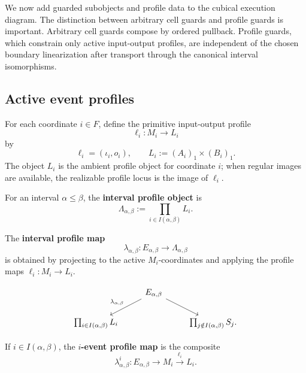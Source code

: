 We now add guarded subobjects and profile data to the cubical execution
diagram. The distinction between arbitrary cell guards and profile guards is
important. Arbitrary cell guards compose by ordered pullback. Profile guards,
which constrain only active input-output profiles, are independent of the
chosen boundary linearization after transport through the canonical interval
isomorphisms.

\subsection{Active event profiles}
\label{subsec:cmett-active-event-profiles}

For each coordinate \(i\in F\), define the primitive input-output profile
\[
    \ell_i:M_i\to L_i
\]
by
\[
    \ell_i=(\iota_i,o_i),
    \qquad
    L_i:=(A_i)_1\times(B_i)_1.
\]
The object \(L_i\) is the ambient profile object for coordinate \(i\); when
regular images are available, the realizable profile locus is the image of
\(\ell_i\).

\begin{definition}
\label{def:cmett-interval-profile-object}
    For an interval \(\alpha\leq\beta\), the \textbf{interval profile object}
    is
    \[
        \Lambda_{\alpha,\beta}
        :=
        \prod_{i\in I(\alpha,\beta)}L_i.
    \]
\end{definition}

\begin{definition}
\label{def:cmett-interval-profile-map}
    The \textbf{interval profile map}
    \[
        \lambda_{\alpha,\beta}:E_{\alpha,\beta}\to\Lambda_{\alpha,\beta}
    \]
    is obtained by projecting to the active \(M_i\)-coordinates and applying
    the profile maps \(\ell_i:M_i\to L_i\).
\end{definition}

\[
\begin{tikzcd}
&
E_{\alpha,\beta}
    \arrow[dl,"\lambda_{\alpha,\beta}"']
    \arrow[dr]
&
\\
\prod_{i\in I(\alpha,\beta)}L_i
&&
\prod_{j\notin I(\alpha,\beta)}S_j .
\end{tikzcd}
\]

\begin{definition}
\label{def:cmett-event-profile-map}
    If \(i\in I(\alpha,\beta)\), the \textbf{\(i\)-event profile map} is the
    composite
    \[
        \lambda_{\alpha,\beta}^{i}:
        E_{\alpha,\beta}
        \longrightarrow
        M_i
        \xrightarrow{\ell_i}
        L_i.
    \]
\end{definition}

